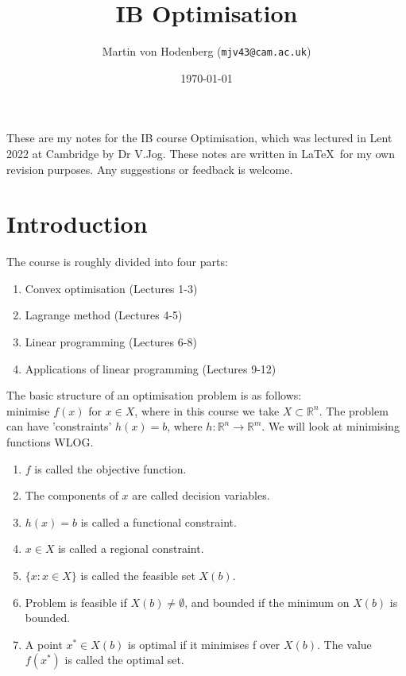 \documentclass[a4paper]{scrartcl}
\title{IB Optimisation}
\author{Martin von Hodenberg (\texttt{mjv43@cam.ac.uk})}
\date{\today}
\begin{document}
\maketitle

These are my notes for the IB course Optimisation, which was lectured in Lent 2022 at Cambridge by Dr V.Jog. These notes are written in \LaTeX  \ for my own revision purposes. Any suggestions or feedback is welcome.

\tableofcontents
\newpage 

\section{Introduction}

The course is roughly divided into four parts:
\begin{enumerate}
	\item Convex optimisation (Lectures 1-3)
	\item Lagrange method (Lectures 4-5)
	\item Linear programming (Lectures 6-8)
	\item Applications of linear programming (Lectures 9-12)
\end{enumerate}

\begin{definition*}
	The basic structure of an optimisation problem is as follows:\\
	minimise $f(x)$ for $x \in X$, where in this course we take $X \subset \mathbb{R}^n$. The problem can have 'constraints' $h(x)=b$, where $h:\mathbb{R}^n \to \mathbb{R}^m$. We will look at minimising functions WLOG.
	
	\begin{enumerate}
		\item $f$ is called the objective function.
		\item The components of $x$ are called decision variables.
		\item $h(x)=b$ is called a functional constraint.
		\item $x \in X$ is called a regional constraint.
		\item $\{x: x \in X\}$ is called the feasible set $X (b) $.
		\item Problem is feasible if $X(b)\neq \emptyset$, and bounded if the minimum on $X(b)$ is bounded.
		\item A point $x^* \in X(b)$ is optimal if it minimises f over $X(b)$. The value $f(x^*)$ is called the optimal set. 
	\end{enumerate}
	
\end{definition*}
\newpage
\end{document}

